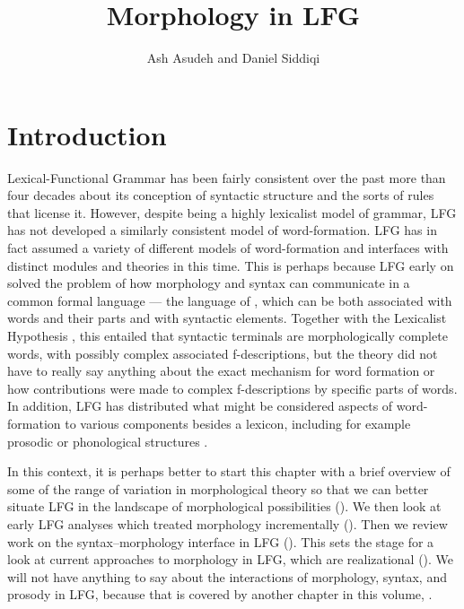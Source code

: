 \documentclass[output=paper,hidelinks]{langscibook}
\title{Morphology in LFG}
\author{Ash Asudeh\affiliation{University of Rochester} and  Daniel Siddiqi\affiliation{Carleton University}}
\begin{document}
\maketitle
\label{chap:Morphology}

\section{Introduction}
\label{sec:Morph:introduction}



Lexical-Functional Grammar has been fairly consistent over the past
more than four decades about its conception of syntactic structure and the sorts
of rules that license it. However, despite being a highly lexicalist
model of grammar, LFG has not developed a similarly consistent model
of word-formation.  LFG has in fact assumed a variety of different
models of word-formation and interfaces with distinct
 modules and theories in this time. This is
perhaps because LFG early on solved the problem of how morphology and
syntax can communicate in a common formal language --- the language of
, which can be both associated with
words and their parts and with syntactic elements. Together with the
Lexicalist Hypothesis \citep[92]{lapointe80,chomsky1970remarks,BresnanEtAl2016},
this entailed that syntactic terminals are morphologically complete
words, with possibly complex associated f-descriptions, but the theory
did not have to really say anything about the exact mechanism for word
formation or how contributions were made to complex f-descriptions by
specific parts of words.  In addition, LFG has distributed what might
be considered aspects of word-formation to various components besides
a lexicon, including for example prosodic or phonological structures
\citep{DM11,Boegel2015}.
 
In this context, it is perhaps better to start this chapter with a
brief overview of some of the range of variation in morphological theory so
that we can better situate LFG in the landscape of morphological
possibilities (). We then look at 
early LFG analyses which treated morphology incrementally
(). Then we review work on the
syntax--morphology interface in LFG
(). This sets the stage for a look at 
current approaches to morphology in LFG, which are {realizational}
(). We will not have anything to say
about the interactions of morphology, syntax, and prosody in LFG,
because that is covered by another chapter in this volume,
.
\end{document}
